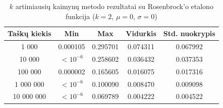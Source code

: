 \begin{table}[H]
    \centering
    \begin{tabular}{|c|c|c|c|c|}
        \hline
        \textbf{Taškų kiekis} & \textbf{Min} & \textbf{Max} & \textbf{Vidurkis} & \textbf{Std. nuokrypis} \\ \hline
        1 000        & 0.000105 & 0.295701 & 0.074311 & 0.067992 \\ \hline
        10 000       & $<10^{-6}$ & 0.258602 & 0.036432 & 0.037353 \\ \hline
        100 000      & 0.000002 & 0.165605 & 0.016075 & 0.017316 \\ \hline
        1 000 000    & $<10^{-6}$ & 0.100090 & 0.008470 & 0.009098 \\ \hline
        10 000 000   & $<10^{-6}$ & 0.069789 & 0.004222 & 0.004522 \\ \hline
    \end{tabular}
    \caption{$k$ artimiausių kaimynų metodo rezultatai su Rosenbrock'o etalono funkcija ($k = 2$, $\mu = 0$, $\sigma = 0$)}
\end{table}